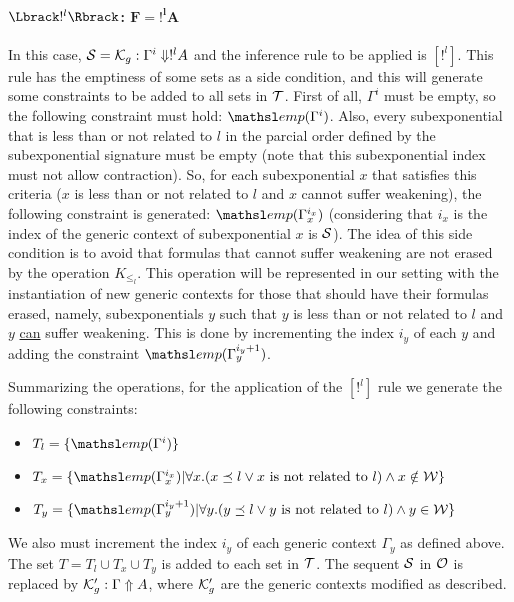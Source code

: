 \paragraph{$\alg{!^l}$: $\mathbf{F = !^l A}$\\}
In this case, $\mathcal{S} = \mathcal{K}_{g} : \Gamma^i \Downarrow !^l A$ and the inference
rule to be applied is $[!^l]$. This rule has the emptiness of some sets as a
side condition, and this will generate some constraints to be added to all sets
in $\mathcal{T}$. First of all, $\Gamma^i$ must be empty, so the following constraint 
must hold: $\emp{\Gamma^i}$. Also,
every subexponential that is less than or not related to $l$ in the parcial
order defined by the subexponential signature must be empty (note that this
subexponential index must not allow contraction). So, for each subexponential
$x$ that satisfies this criteria ($x$ is less than or not related to $l$ and $x$
cannot suffer weakening), the following constraint is generated:
$\emp{\Gamma_x^{i_x}}$ (considering that $i_x$ is the index of the generic
context of subexponential $x$ is $\mathcal{S}$). The idea of this side condition is to
avoid that formulas that cannot suffer weakening are not erased by the operation
$K_{\leq_l}$. This operation will be represented in our setting with the
instantiation of new generic contexts for those that should have their formulas
erased, namely, subexponentials $y$ such that $y$ is less than or not related to
$l$ and $y$ \underline{can} suffer weakening. This is done by incrementing the
index $i_y$ of each $y$ and adding the constraint $\emp{\Gamma_y^{i_y + 1}}$.

Summarizing the operations, for the application of the $[!^l]$ rule we generate
the following constraints:

\begin{itemize}
    \item $T_l = \{ \emp{\Gamma^i} \}$
    \item $T_x = \{ \emp{\Gamma_x^{i_x}} | \forall x. (x \preceq l \vee x \text{ is
    not related to } l) \wedge x \notin \Wscr \}$
    \item $T_y = \{ \emp{\Gamma_y^{i_y + 1}} | \forall y. (y \preceq l \vee y \text{ is
    not related to } l) \wedge y \in \Wscr \}$
\end{itemize}

We also must increment the index $i_y$ of each generic context $\Gamma_y$ as
defined above. The set $T = T_l \cup T_x \cup T_y$ is added to each set in
$\mathcal{T}$. The sequent $\mathcal{S}$ in $\mathcal{O}$ is replaced by $\mathcal{K}_{g}' : \Gamma
\Uparrow A$, where $\mathcal{K}_{g}'$ are the generic contexts modified as
described.

